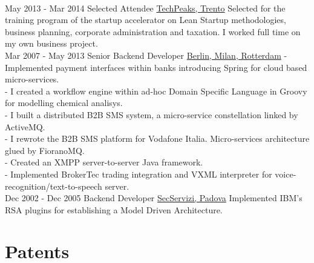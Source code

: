 \documentclass[letterpaper]{twentysecondcv} %
\begin{document}
\begin{twenty}
{{    }
        }
     \\
     \twentyitem
   		{May 2013 -}
		{Mar 2014}
        {Selected Attendee}
        {\href{https://www.repubblica.it/rubriche/startup-stories/2013/12/02/news/incubatore_startup-72502909/}{TechPeaks, Trento}}
        {}
        {
Selected for the training program of the startup accelerator on Lean Startup methodologies, business planning, corporate administration and taxation. I worked full time on my own business project.
    	}
    	\\
     \twentyitem
   		{Mar 2007 -}
		{May 2013}
        {Senior Backend Developer}
        {\href{}{Berlin, Milan, Rotterdam}}
        {}
        {
- Implemented payment interfaces within banks introducing Spring for cloud based micro-services.
        \\
- I created a workflow engine within ad-hoc Domain Specific Language in Groovy for modelling chemical analisys.
        \\
- I built a distributed B2B SMS system, a micro-service constellation linked by ActiveMQ.
        \\
- I rewrote the B2B SMS platform for Vodafone Italia. Micro-services architecture glued by FioranoMQ.
        \\
- Created an XMPP server-to-server Java framework.
        \\
- Implemented BrokerTec trading integration and VXML interpreter for  voice-recognition/text-to-speech server.
	}
   	\\
     \twentyitem
   		{Dec 2002 -}
		{Dec 2005}
        {Backend Developer}
        {\href{}{SecServizi, Padova}}
        {}
        {
    Implemented IBM's RSA plugins for establishing a Model Driven Architecture.
       	}
        
\end{twenty}

\section{Patents}
\end{document}
